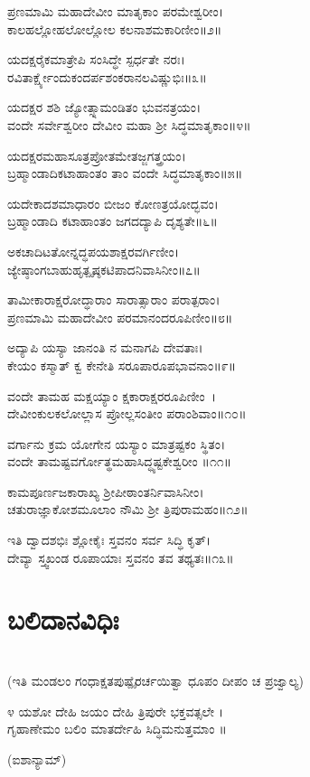ಪ್ರಣಮಾಮಿ ಮಹಾದೇವೀಂ ಮಾತೃಕಾಂ ಪರಮೇಶ್ವರೀಂ।\\
ಕಾಲಹಲ್ಲೋಹಲೋಲ್ಲೋಲ ಕಲನಾಶಮಕಾರಿಣೀಂ॥೨॥

ಯದಕ್ಷರೈಕಮಾತ್ರೇಪಿ ಸಂಸಿದ್ಧೇ ಸ್ಪರ್ಧತೇ ನರಃ।\\
ರವಿತಾರ್ಕ್ಷ್ಯೇಂದುಕಂದರ್ಪಶಂಕರಾನಲವಿಷ್ಣುಭಿಃ॥೩॥

ಯದಕ್ಷರ ಶಶಿ ಜ್ಯೋತ್ಸ್ನಾಮಂಡಿತಂ ಭುವನತ್ರಯಂ।\\
ವಂದೇ ಸರ್ವೇಶ್ವರೀಂ ದೇವೀಂ ಮಹಾ ಶ್ರೀ ಸಿದ್ಧಮಾತೃಕಾಂ॥೪॥

ಯದಕ್ಷರಮಹಾಸೂತ್ರಪ್ರೋತಮೇತಜ್ಜಗತ್ತ್ರಯಂ।\\
ಬ್ರಹ್ಮಾಂಡಾದಿಕಟಾಹಾಂತಂ ತಾಂ ವಂದೇ ಸಿದ್ಧಮಾತೃಕಾಂ॥೫॥

ಯದೇಕಾದಶಮಾಧಾರಂ ಬೀಜಂ ಕೋಣತ್ರಯೋದ್ಭವಂ।\\
ಬ್ರಹ್ಮಾಂಡಾದಿ ಕಟಾಹಾಂತಂ ಜಗದದ್ಯಾಪಿ ದೃಶ್ಯತೇ॥೬॥

ಅಕಚಾದಿಟತೋನ್ನದ್ಧಪಯಶಾಕ್ಷರವರ್ಗಿಣೀಂ।\\
ಜ್ಯೇಷ್ಠಾಂಗಬಾಹುಹೃತ್ಪೃಷ್ಠಕಟಿಪಾದನಿವಾಸಿನೀಂ॥೭॥

ತಾಮೀಕಾರಾಕ್ಷರೋದ್ಧಾರಾಂ ಸಾರಾತ್ಸಾರಾಂ ಪರಾತ್ಪರಾಂ।\\
ಪ್ರಣಮಾಮಿ ಮಹಾದೇವೀಂ ಪರಮಾನಂದರೂಪಿಣೀಂ॥೮॥

ಅದ್ಯಾಪಿ ಯಸ್ಯಾ ಜಾನಂತಿ ನ ಮನಾಗಪಿ ದೇವತಾಃ।\\
ಕೇಯಂ ಕಸ್ಮಾತ್ ಕ್ವ ಕೇನೇತಿ ಸರೂಪಾರೂಪಭಾವನಾಂ॥೯॥

ವಂದೇ ತಾಮಹ ಮಕ್ಷಯ್ಯಾಂ ಕ್ಷಕಾರಾಕ್ಷರರೂಪಿಣೀಂ~।\\
ದೇವೀಂಕುಲಕಲೋಲ್ಲಾಸ ಪ್ರೋಲ್ಲಸಂತೀಂ ಪರಾಂಶಿವಾಂ॥೧೦॥

ವರ್ಗಾನು ಕ್ರಮ ಯೋಗೇನ ಯಸ್ಯಾಂ ಮಾತ್ರಷ್ಟಕಂ ಸ್ಥಿತಂ।\\
ವಂದೇ ತಾಮಷ್ಟವರ್ಗೋತ್ಥಮಹಾಸಿದ್ಧ್ಯಷ್ಟಕೇಶ್ವರೀಂ ॥೧೧॥

ಕಾಮಪೂರ್ಣಜಕಾರಾಖ್ಯ ಶ್ರೀಪೀಠಾಂತರ್ನಿವಾಸಿನೀಂ।\\
ಚತುರಾಜ್ಞಾಕೋಶಮೂಲಾಂ ನೌಮಿ ಶ್ರೀ ತ್ರಿಪುರಾಮಹಂ॥೧೨॥

ಇತಿ ದ್ವಾದಶಭಿಃ ಶ್ಲೋಕೈಃ ಸ್ತವನಂ ಸರ್ವ ಸಿದ್ಧಿ ಕೃತ್।\\
ದೇವ್ಯಾ ಸ್ತ್ವಖಂಡ ರೂಪಾಯಾಃ ಸ್ತವನಂ ತವ ತಥ್ಯತಃ॥೧೩॥
\section{ಬಲಿದಾನವಿಧಿಃ}
\\ (ಇತಿ ಮಂಡಲಂ ಗಂಧಾಕ್ಷತಪುಷ್ಪೈರರ್ಚಯಿತ್ವಾ ಧೂಪಂ ದೀಪಂ ಚ ಪ್ರಜ್ವಾಲ್ಯ)

೪ ಯಶೋ ದೇಹಿ ಜಯಂ ದೇಹಿ ತ್ರಿಪುರೇ ಭಕ್ತವತ್ಸಲೇ ।\\ ಗೃಹಾಣೇಮಂ ಬಲಿಂ ಮಾತರ್ದೇಹಿ ಸಿದ್ಧಿಮನುತ್ತಮಾಂ ॥

(ಐಶಾನ್ಯಾಮ್)\\

